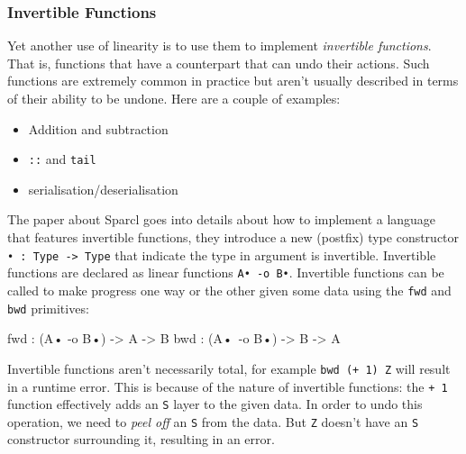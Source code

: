 \documentclass[
]{article}
\newenvironment{Shaded}{}{}
\newcommand{\DataTypeTok}[1]{\textcolor[rgb]{0.56,0.13,0.00}{#1}}
\newcommand{\NormalTok}[1]{#1}
\newcommand{\OperatorTok}[1]{\textcolor[rgb]{0.40,0.40,0.40}{#1}}
\newcommand{\OtherTok}[1]{\textcolor[rgb]{0.00,0.44,0.13}{#1}}
\providecommand{\tightlist}{%
  \setlength{\itemsep}{0pt}\setlength{\parskip}{0pt}}
\begin{document}
\hypertarget{invertible-functions}{%
\subsubsection{Invertible Functions}\label{invertible-functions}}

Yet another use of linearity is to use them to implement
\emph{invertible functions}. That is, functions that have a counterpart
that can undo their actions. Such functions are extremely common in
practice but aren't usually described in terms of their ability to be
undone. Here are a couple of examples:

\begin{itemize}
\tightlist
\item
  Addition and subtraction
\item
  \texttt{::} and \texttt{tail}
\item
  serialisation/deserialisation
\end{itemize}

The paper about Sparcl\cite{invertible_functions} goes into details
about how to implement a language that features invertible functions,
they introduce a new (postfix) type constructor
\texttt{•\ :\ Type\ -\textgreater{}\ Type} that indicate the type in
argument is invertible. Invertible functions are declared as linear
functions \texttt{A•\ -o\ B•}. Invertible functions can be called to
make progress one way or the other given some data using the
\texttt{fwd} and \texttt{bwd} primitives:

\begin{Shaded}
\begin{Highlighting}[]
\NormalTok{fwd }\OperatorTok{:}\NormalTok{ (}\DataTypeTok{A}\NormalTok{• }\OperatorTok{{-}}\NormalTok{o }\DataTypeTok{B}\NormalTok{•) }\OtherTok{{-}\textgreater{}} \DataTypeTok{A} \OtherTok{{-}\textgreater{}} \DataTypeTok{B}
\NormalTok{bwd }\OperatorTok{:}\NormalTok{ (}\DataTypeTok{A}\NormalTok{• }\OperatorTok{{-}}\NormalTok{o }\DataTypeTok{B}\NormalTok{•) }\OtherTok{{-}\textgreater{}} \DataTypeTok{B} \OtherTok{{-}\textgreater{}} \DataTypeTok{A}
\end{Highlighting}
\end{Shaded}

Invertible functions aren't necessarily total, for example
\texttt{bwd\ (+\ 1)\ Z} will result in a runtime error. This is because
of the nature of invertible functions: the \texttt{+\ 1} function
effectively adds an \texttt{S} layer to the given data. In order to undo
this operation, we need to \emph{peel off} an \texttt{S} from the data.
But \texttt{Z} doesn't have an \texttt{S} constructor surrounding it,
resulting in an error.
\end{document}
